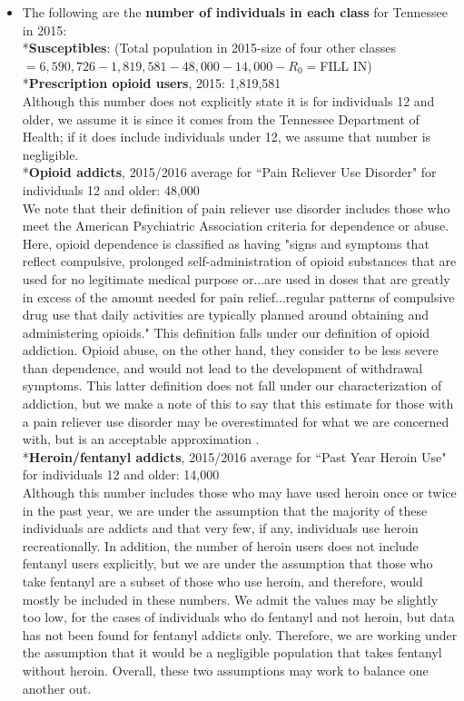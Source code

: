 \documentclass[12pt]{article}
\begin{document}
\begin{itemize}



\item The following are the \textbf{number of individuals in each class} for Tennessee in 2015: \\

*\textbf{Susceptibles}: (Total population in 2015-size of four other classes$=6,590,726-1,819,581-48,000-14,000-R_{0}=$FILL IN) \cite{USCensus} \\

*\textbf{Prescription opioid users}, 2015: 1,819,581 \cite{TNgov1} \\
Although this number does not explicitly state it is for individuals 12 and older, we assume it is since it comes from the Tennessee Department of Health; if it does include individuals under 12, we assume that number is negligible. \\

*\textbf{Opioid addicts}, 2015/2016 average for ``Pain Reliever Use Disorder" for individuals 12 and older: 48,000 \cite{NSDUH2} \\
We note that their definition of pain reliever use disorder includes those who meet the American Psychiatric Association criteria for dependence or abuse. Here, opioid dependence is classified as having "signs and symptoms that reflect compulsive, prolonged self-administration of opioid substances that are used for no legitimate medical purpose or...are used in doses that are greatly in excess of the amount needed for pain relief...regular patterns of compulsive drug use that daily activities are typically planned around obtaining and administering opioids." This definition falls under our definition of opioid addiction. Opioid abuse, on the other hand, they consider to be less severe than dependence, and would not lead to the development of withdrawal symptoms. This latter definition does not fall under our characterization of addiction, but we make a note of this to say that this estimate for those with a pain reliever use disorder may be overestimated for what we are concerned with, but is an acceptable approximation  \cite{DSM}.\\

*\textbf{Heroin/fentanyl addicts}, 2015/2016 average for ``Past Year Heroin Use" for individuals 12 and older: 14,000 \cite{NSDUH2}  \\ 
Although this number includes those who may have used heroin once or twice in the past year, we are under the assumption that the majority of these individuals are addicts and that very few, if any, individuals use heroin recreationally. In addition, the number of heroin users does not include fentanyl users explicitly, but we are under the assumption that those who take fentanyl are a subset of those who use heroin, and therefore, would mostly be included in these numbers. We admit the values may be slightly too low, for the cases of individuals who do fentanyl and not heroin, but data has not been found for fentanyl addicts only. Therefore, we are working under the assumption that it would be a negligible population that takes fentanyl without heroin. Overall, these two assumptions may work to balance one another out. 



\end{itemize}
\end{document}
